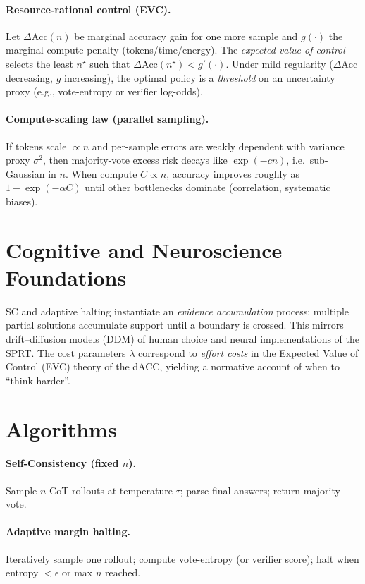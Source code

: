 \paragraph{Resource-rational control (EVC).}
Let $\Delta \mathrm{Acc}(n)$ be marginal accuracy gain for one more sample and $g(\cdot)$ the marginal compute penalty (tokens/time/energy). The \emph{expected value of control} selects the least $n^\star$ such that $\Delta \mathrm{Acc}(n^\star)\!<\!g'(\cdot)$. Under mild regularity ($\Delta \mathrm{Acc}$ decreasing, $g$ increasing), the optimal policy is a \emph{threshold} on an uncertainty proxy (e.g., vote-entropy or verifier log-odds). 

\paragraph{Compute-scaling law (parallel sampling).}
If tokens scale $\propto n$ and per-sample errors are weakly dependent with variance proxy $\sigma^2$, then majority-vote excess risk decays like $\exp(-c n)$, i.e.\ sub-Gaussian in $n$. When compute $C\propto n$, accuracy improves roughly as $1-\exp(-\alpha C)$ until other bottlenecks dominate (correlation, systematic biases).

\section{Cognitive and Neuroscience Foundations}
SC and adaptive halting instantiate an \emph{evidence accumulation} process: multiple partial solutions accumulate support until a boundary is crossed. This mirrors drift–diffusion models (DDM) of human choice and neural implementations of the SPRT. The cost parameters $\lambda$ correspond to \emph{effort costs} in the Expected Value of Control (EVC) theory of the dACC, yielding a normative account of when to ``think harder''.

\section{Algorithms}
\paragraph{Self-Consistency (fixed $n$).}
Sample $n$ CoT rollouts at temperature $\tau$; parse final answers; return majority vote. 
\paragraph{Adaptive margin halting.}
Iteratively sample one rollout; compute vote-entropy (or verifier score); halt when entropy $<\epsilon$ or max $n$ reached.

